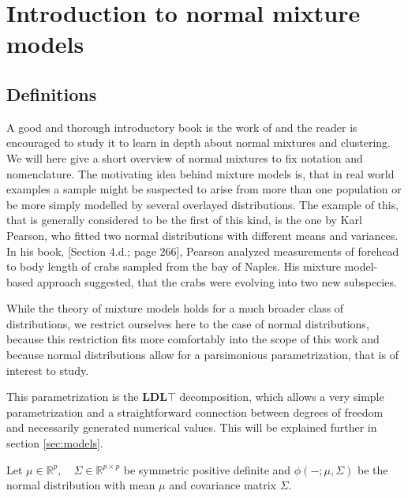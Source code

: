 \chapter{Introduction to normal mixture models}





\section{Definitions}

A good and thorough introductory book is the work of \cite{McL00} and
the reader is encouraged to study it to learn in depth about normal mixtures
and clustering. 
We will here give a short overview of normal mixtures to fix notation and 
nomenclature.
The motivating idea behind mixture models is, that in real world examples
a sample might be suspected to arise from more than one population or be 
more simply modelled by several overlayed distributions.
The example of this, that is generally considered to be the first of this kind,
is the one by Karl Pearson, who fitted two normal distributions with different 
means and variances.
In his book, \cite{Pea96}[Section 4.d.; page 266], Pearson analyzed measurements
of forehead to body length of crabs sampled from the bay of Naples. His mixture 
model-based approach suggested, that the crabs were evolving into two new 
subspecies.

While the theory of mixture models holds for a much broader class of 
distributions, we restrict ourselves here to the case of normal distributions,
because this restriction fits more comfortably into the scope of this work and 
because normal distributions allow for a parsimonious parametrization, that is 
of interest to study.

This parametrization is the $\pmb{LDL}\top$ decomposition, which allows a very 
simple parametrization and a straightforward connection between degrees of 
freedom and necessarily generated numerical values. This will be explained 
further in section \ref{sec:models}.

Let $ \mu \in \mathbb{R}^p , \quad \Sigma \in \mathbb{R}^{p \times p} $ be
symmetric positive definite and $ \phi(- ; \mu, \Sigma) $ be the normal 
distribution with mean $ \mu $ and covariance matrix $ \Sigma $.


